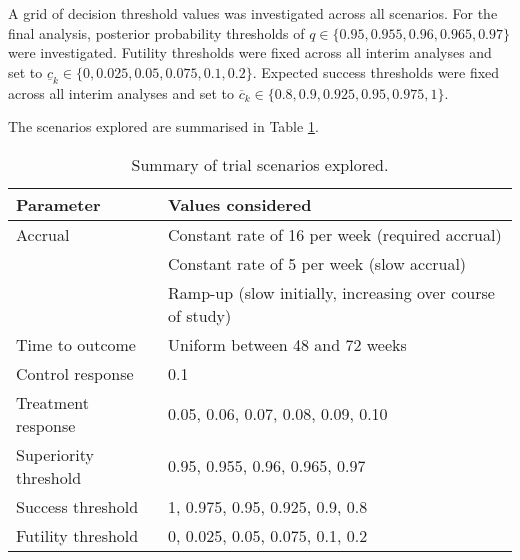 \documentclass{bmcart}
\begin{document}
A grid of decision threshold values was investigated across all scenarios.
For the final analysis, posterior probability thresholds of $q\in\{0.95,0.955,0.96,0.965,0.97\}$ were investigated.
Futility thresholds were fixed across all interim analyses and set to $\underline{c}_k\in\{0,0.025,0.05,0.075,0.1,0.2\}$.
Expected success thresholds were fixed across all interim analyses and set to $\overline{c}_k\in\{0.8,0.9,0.925,0.95,0.975,1\}$.

The scenarios explored are summarised in Table \ref{tab:scenarios}.

\begin{table}[!ht]
	\caption{Summary of trial scenarios explored.}
	\label{tab:scenarios}
	\begin{tabular}{ll}
		Parameter & Values considered \\ \hline
		Accrual & Constant rate of 16 per week (required accrual) \\
		& Constant rate of 5 per week (slow accrual) \\
		& Ramp-up (slow initially, increasing over course of study) \\
		Time to outcome & Uniform between 48 and 72 weeks \\
		Control response & 0.1 \\
		Treatment response & 0.05, 0.06, 0.07, 0.08, 0.09, 0.10 \\
		Superiority threshold & 0.95, 0.955, 0.96, 0.965, 0.97 \\
		Success threshold & 1, 0.975, 0.95, 0.925, 0.9, 0.8 \\
		Futility threshold & 0, 0.025, 0.05, 0.075, 0.1, 0.2 \\
		\hline
	\end{tabular}
\end{table}


\end{document}
